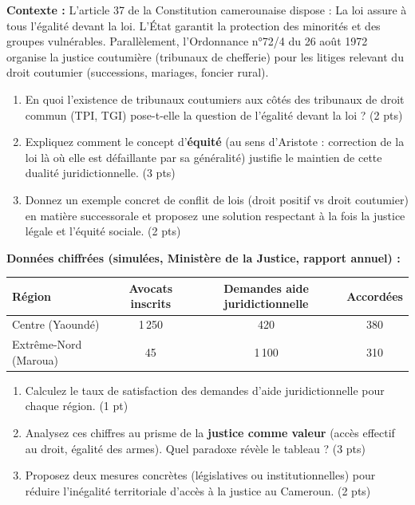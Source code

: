 \documentclass[11pt]{article}
\begin{document}
\begin{exercice}
\textbf{Contexte :} L'article 37 de la Constitution camerounaise dispose : \og La loi assure à tous l'égalité devant la loi. L'État garantit la protection des minorités et des groupes vulnérables.\fg{} Parallèlement, l'Ordonnance n°72/4 du 26 août 1972 organise la justice coutumière (tribunaux de chefferie) pour les litiges relevant du droit coutumier (successions, mariages, foncier rural).
\begin{enumerate}
    \item En quoi l'existence de tribunaux coutumiers aux côtés des tribunaux de droit commun (TPI, TGI) pose-t-elle la question de l'\og égalité devant la loi\fg{} ? (2 pts)
    \item Expliquez comment le concept d'\textbf{équité} (au sens d'Aristote : correction de la loi là où elle est défaillante par sa généralité) justifie le maintien de cette dualité juridictionnelle. (3 pts)
    \item Donnez un exemple concret de conflit de lois (droit positif vs droit coutumier) en matière successorale et proposez une solution respectant à la fois la justice légale et l'équité sociale. (2 pts)
\end{enumerate}
\end{exercice}

\begin{exercice}
\textbf{Données chiffrées (simulées, Ministère de la Justice, rapport annuel) :}
\begin{center}
\begin{tabular}{|l|c|c|c|}
\hline
\textbf{Région} & \textbf{Avocats inscrits} & \textbf{Demandes aide juridictionnelle} & \textbf{Accordées} \\
\hline
Centre (Yaoundé) & 1\,250 & 420 & 380 \\
Extrême-Nord (Maroua) & 45 & 1\,100 & 310 \\
\hline
\end{tabular}
\end{center}
\begin{enumerate}
    \item Calculez le taux de satisfaction des demandes d'aide juridictionnelle pour chaque région. (1 pt)
    \item Analysez ces chiffres au prisme de la \textbf{justice comme valeur} (accès effectif au droit, égalité des armes). Quel paradoxe révèle le tableau ? (3 pts)
    \item Proposez deux mesures concrètes (législatives ou institutionnelles) pour réduire l'inégalité territoriale d'accès à la justice au Cameroun. (2 pts)
\end{enumerate}
\end{exercice}
\end{document}
